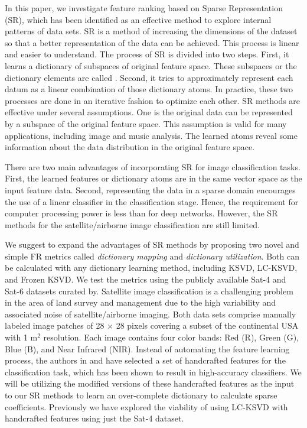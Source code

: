 In this paper, we investigate feature ranking based on Sparse Representation (SR), which has been identified as an effective method to explore internal patterns of data sets\cite{Elad2010}. SR is a method of increasing the dimensions of the dataset so that a better representation of the data can be achieved. This process is linear and easier to understand. The process of SR is divided into two steps. First, it learns a dictionary of subspaces of original feature space. These subspaces or the dictionary elements are called . Second, it tries to approximately represent each datum as a linear combination of those dictionary atoms. In practice, these two processes are done in an iterative fashion to optimize each other. SR methods are effective under several assumptions. One is the original data can be represented by a subspace of the original feature space. This assumption is valid for many applications, including image and music analysis. The learned atoms reveal some information about the data distribution in the original feature space.

There are two main advantages of incorporating SR for image classification tasks. First, the learned features or dictionary atoms are in the same vector space as the input feature data. Second, representing the data in a sparse domain encourages the use of a linear classifier in the classification stage. Hence, the requirement for computer processing power is less than for deep networks. However, the SR methods for the satellite/airborne image classification are still limited.

We suggest to expand the advantages of SR methods by proposing two novel and simple FR metrics called \textit{dictionary mapping} and \textit{dictionary utilization}. Both can be calculated with any dictionary learning method, including KSVD\cite{Aharon2006}, LC-KSVD\cite{Jiang2011}, and Frozen KSVD\cite{Carroll2017}. We test the metrics using the publicly available Sat-4 and Sat-6 datasets curated by\cite{Basu2015}. Satellite image classification is a challenging problem in the area of land survey and management due to the high variability and associated noise of satellite/airborne imaging. Both data sets comprise manually labeled image patches of 28 $\times$ 28 pixels covering a subset of the continental USA with 1 m$^2$ resolution. Each image contains four color bands: Red (R), Green (G), Blue (B), and  Near Infrared (NIR). Instead of automating the feature learning process, the authors in\cite{Basu2015} and\cite{Liu2020} have selected a set of handcrafted features for the classification task, which has been shown to result in high-accuracy classifiers. We will be utilizing the modified versions of these handcrafted features as the input to our SR methods to learn an over-complete dictionary to calculate sparse coefficients. Previously we have explored the viability of using LC-KSVD with handcrafted features using just the Sat-4 dataset\cite{Liyanage2020}. 

